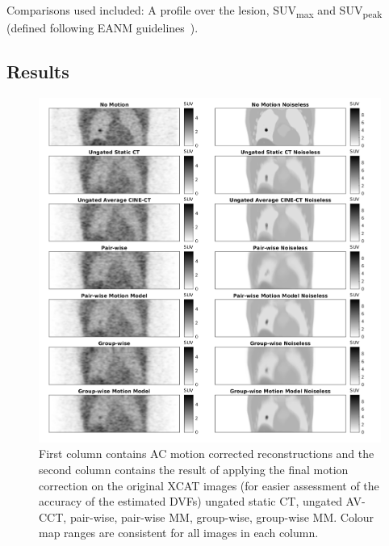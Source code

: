                 Comparisons used included: A profile over the lesion, \gls{SUV}\textsubscript{max} and \gls{SUV}\textsubscript{peak} (defined following \gls{EANM} guidelines~\parencite{Boellaard2015FDG2.0}).
        
        \subsection{Results} \label{sec:comparison_of_motion_correction_methods_incorporating_motion_modelling_for_pet_ct_using_a_single_breath_hold_attenuation_map_results}
            \begin{figure}
                \centering
                
                \includegraphics[width=1.0\linewidth]{figures/motion_correction_1_results_3_visual_analysis.png}
                
                \captionsetup{singlelinecheck=false}
                \caption{
                    First column contains \gls{AC} motion corrected reconstructions and the second column contains the result of applying the final motion correction on the original \gls{XCAT} images (for easier assessment of the accuracy of the estimated \glspl{DVF}) ungated static \gls{CT}, ungated \gls{AV-CCT}, pair-wise, pair-wise \gls{MM}, group-wise, group-wise \gls{MM}. Colour map ranges are consistent for all images in each column.
                }
                \label{fig:comparison_of_motion_correction_methods_incorporating_motion_modelling_for_pet_ct_using_a_single_breath_hold_attenuation_map_results_visual_analysis}
            \end{figure}
            
